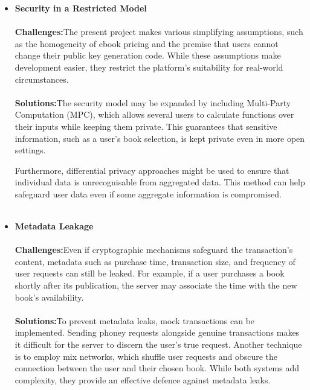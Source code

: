 \documentclass[12pt]{article}
\begin{document}
\begin{itemize}
	\item \textbf{Security in a Restricted Model}\\\\
	\textbf{Challenges:}The present project makes various simplifying assumptions, such as the homogeneity of ebook pricing and the premise that users cannot change their public key generation code. While these assumptions make development easier, they restrict the platform's suitability for real-world circumstances.
	\\\\
	\textbf{Solutions:}The security model may be expanded by including Multi-Party Computation (MPC), which allows several users to calculate functions over their inputs while keeping them private. This guarantees that sensitive information, such as a user's book selection, is kept private even in more open settings. 
	
	Furthermore, differential privacy approaches might be used to ensure that individual data is unrecognisable from aggregated data. This method can help safeguard user data even if some aggregate information is compromised. ~\cite{Cramer2001}\\\\
	
	\item \textbf{Metadata Leakage}\\\\
	\textbf{Challenges:}Even if cryptographic mechanisms safeguard the transaction's content, metadata such as purchase time, transaction size, and frequency of user requests can still be leaked. For example, if a user purchases a book shortly after its publication, the server may associate the time with the new book's availability.\\\\
	\textbf{Solutions:}To prevent metadata leaks, mock transactions can be implemented. Sending phoney requests alongside genuine transactions makes it difficult for the server to discern the user's true request. Another technique is to employ mix networks, which shuffle user requests and obscure the connection between the user and their chosen book. While both systems add complexity, they provide an effective defence against metadata leaks.~\cite{Chaum1981}\\\\
	

\end{itemize}
\end{document}
